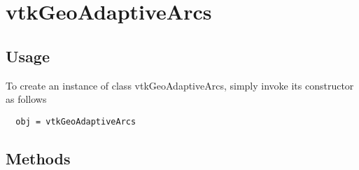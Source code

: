\section{vtkGeoAdaptiveArcs}

\subsection{Usage}


To create an instance of class vtkGeoAdaptiveArcs, simply
invoke its constructor as follows
\begin{verbatim}
  obj = vtkGeoAdaptiveArcs
\end{verbatim}
\subsection{Methods}

